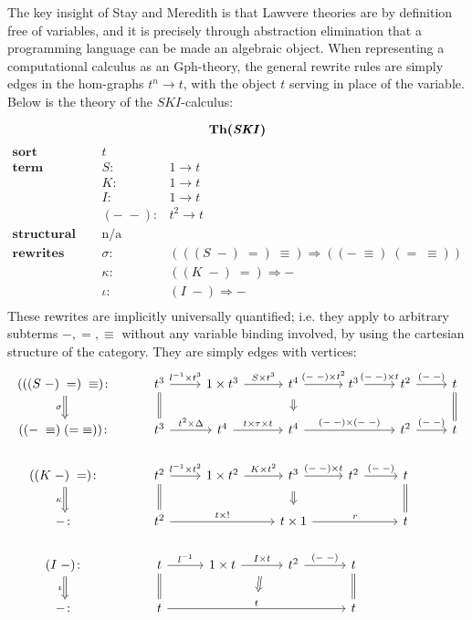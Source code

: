 \documentclass{amsart}
\theoremstyle{definition}
\newcommand{\Gph}{\mathrm{Gph}}
\newcommand{\maps}{\colon}
\begin{document}
The key insight of Stay and Meredith \cite{roswelt} is that Lawvere theories are by definition free of variables, and it is precisely through abstraction elimination that a programming language can be made an algebraic object. When representing a computational calculus as an $\Gph$-theory, the general rewrite rules are simply edges in the hom-graphs $t^n \to t$, with the object $t$ serving in place of the variable. Below is the theory of the $SKI$-calculus:

$$\textbf{Th(\textit{SKI})}$$
\[\begin{array}{rcl}
\textbf{sort} & t &\\
\textbf{term constructors} & S\maps & 1 \to t\\
& K\maps & 1 \to t\\
& I\maps & 1 \to t\\
& (-\; -)\maps &  t^2 \to t\\
\textbf{structural congruence} & \text{n/a} &\\
\textbf{rewrites} & \sigma\maps & (((S\; -)\; =)\; \equiv) \Rightarrow ((-\; \equiv)\; (=\; \equiv))\\
& \kappa\maps & ((K\; -)\; =) \Rightarrow -\\
& \iota\maps & (I\; -) \Rightarrow -\\
\end{array}\]
These rewrites are implicitly universally quantified; i.e. they apply to arbitrary subterms $-, =, \equiv$ without any variable binding involved, by using the cartesian structure of the category. They are simply edges with vertices:
\[\begin{tikzcd}
(((S\; -)\; =)\; \equiv)\maps \arrow[Rightarrow,d,swap,"\sigma"] & t^3 \arrow[d,equal] \arrow[r,"l^{-1} \times t^3"] & 1\times t^3 \arrow[r,"S \times t^3"] & t^4 \arrow[Rightarrow,d,shorten >=0.2cm,shorten <=0.2cm] \arrow[r,"(-\;-)\times t^2"] & t^3 \arrow[r,"(-\;-) \times t"] & t^2 \arrow[r,"(-\;-)"] & t\arrow[d,equal]\\
((-\; \equiv)\; (=\; \equiv))\maps & t^3 \arrow[r,"t^2 \times \Delta"] & t^4 \arrow[r,"t \times \tau \times t"]& t^4 \arrow[rr,"(-\;-) \times (-\;-)"]&& t^2 \arrow[r,"(-\;-)"]& t\\
((K\; -)\; =)\maps \arrow[Rightarrow,d,swap,"\kappa"] & t^2 \arrow[d,equal] \arrow[r,"l^{-1} \times t^2"] & 1\times t^2 \arrow[r,"K \times t^2"] & t^3 \arrow[Rightarrow,d,shorten >=0.2cm,shorten <=0.2cm] \arrow[r,"(-\;-)\times t"] & t^2 \arrow[r,"(-\;-)"] & t \arrow[d,equal]\\
-\maps & t^2 \arrow[rr,"t \times !"] && t \times 1 \arrow[rr,"r"] && t\\
(I\; -)\maps \arrow[Rightarrow,d,swap,"\iota"] & t \arrow[d,equal] \arrow[r,"l^{-1}"] & 1\times t \arrow[r,"I \times t",""name=1] & t^2 \arrow[r,"(-\;-)"] & t \arrow[d,equal]\\
-\maps & t \arrow[rrr,"t",""name=2] \arrow[Rightarrow,from=1,to=2,shorten >=0.3cm,shorten <=0.3cm] &&& t
\end{tikzcd}\]
\end{document}
